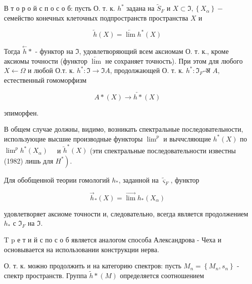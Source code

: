 \documentclass[10pt]{article}
\begin{document}
В т о р о й с п о с о б: пусть О. т. к. $h^{*}$ задана на $\widetilde{S}_{F}$ и $X \subset \Im,\left\{X_{\alpha}\right\}-$ семейство конечных клеточных подпространств пространства $X$ и



\[

\overleftarrow{h}(X)=\overleftarrow{\lim } h^{*}(X)

\]



Тогда $\stackrel{\leftarrow}{h} *$ - функтор на $\Im$, удовлетворяющий всем аксиомам О. т. к., кроме аксиомы точности (функтор $\overleftarrow{\lim }$ не сохраняет точность). При этом для любого $X \leftarrow \Omega$ и любой О.т. к. $h^{*}: \Im \rightarrow \Im A$, продолжающей О. т. к. $h^{*}: \Im_{F}$-अ $A$, естественный гомоморфизм



\[

A *(X) \rightarrow \overleftarrow{h *}(X)

\]



эпиморфен.



В общем случае должны, видимо, возникать спектральные последовательности, используюцие высшие производные функторы $\lim ^{p}$ и выччсляющие $h^{*}(X)$ по$\lim ^{p} h^{*}\left(X_{\alpha}\right) \quad$ и $\overleftarrow{h}^{*}(X)$ (эти спектральные последовательности известны (1982) лишь для $\left.H^{*}\right)$.



Для обобщенной теории гомологий $h_{*}$, заданной на $\widetilde{\varsigma}_{F}$, функтор



\[

\vec{h}_{*}(X)=\overrightarrow{\lim } h_{*}\left(X_{\alpha}\right)

\]



удовлетворяет аксиоме точности и, следовательно, всегда является продолжением $h_{*}$ с $\Im_{F}$ на $\Im$.



T p е т и й с по с о б является аналогом способа Александрова - Чеха и основывается на использовании конструкции нерва.



О. т. к. можно продолжить и на категорию спектров: пусть $M_{n}=\left\{M_{n}, s_{n}\right\}$ - спектр пространств. Группа $\tilde{h} *(M)$ определяется соотношением
\end{document}

